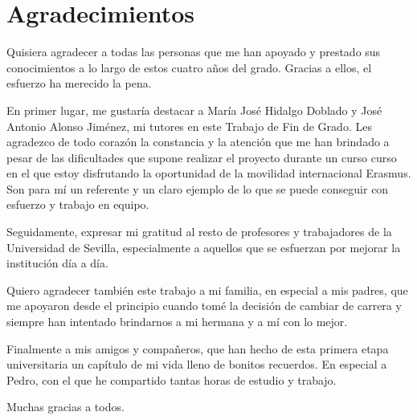 \chapter*{Agradecimientos}

Quisiera agradecer a todas las personas que me han apoyado y prestado
sus conocimientos a lo largo de estos cuatro años del grado. Gracias a ellos, 
el esfuerzo ha merecido la pena.

En primer lugar, me gustaría destacar a María José Hidalgo Doblado y José 
Antonio Alonso Jiménez, mi tutores en este Trabajo de Fin de Grado. Les
agradezco de todo corazón la constancia y la atención que me han brindado 
a pesar de las dificultades que supone realizar el proyecto durante un curso
curso en el que estoy disfrutando la oportunidad de la movilidad internacional
Erasmus. Son para mí un referente y un claro ejemplo de lo que se puede 
conseguir con esfuerzo y trabajo en equipo.

Seguidamente, expresar mi gratitud al resto de profesores y trabajadores
de la Universidad de Sevilla, especialmente a aquellos que se esfuerzan 
por mejorar la institución día a día.

Quiero agradecer también este trabajo a mi familia, en especial a mis padres,
que me apoyaron desde el principio cuando tomé la decisión de cambiar de
carrera y siempre han intentado brindarnos a mi hermana y a mí con lo mejor.

Finalmente a mis amigos y compañeros, que han hecho de esta primera etapa 
universitaria un capítulo de mi vida lleno de bonitos recuerdos. En especial
a Pedro, con el que he compartido tantas horas de estudio y trabajo.

Muchas gracias a todos.
